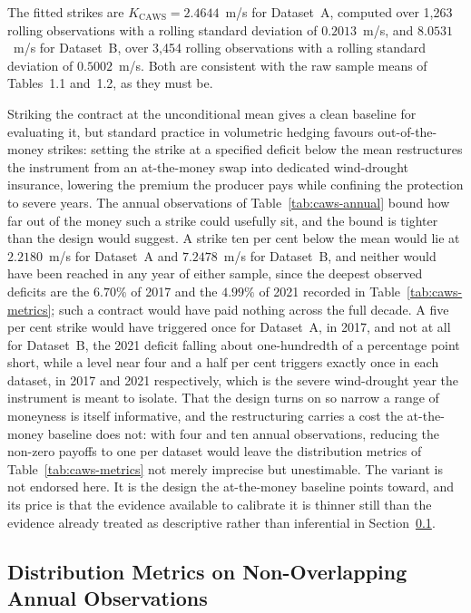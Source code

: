 \documentclass[11pt, a4paper, twoside]{article}
\begin{document}
The fitted strikes are $K_{\mathrm{CAWS}} = 2.4644$~m/s for Dataset~A, computed over 1{,}263 rolling observations with a rolling standard deviation of $0.2013$~m/s, and $8.0531$~m/s for Dataset~B, over 3{,}454 rolling observations with a rolling standard deviation of $0.5002$~m/s. Both are consistent with the raw sample means of Tables~1.1 and~1.2, as they must be.

Striking the contract at the unconditional mean gives a clean baseline for evaluating it, but standard practice in volumetric hedging favours out-of-the-money strikes: setting the strike at a specified deficit below the mean restructures the instrument from an at-the-money swap into dedicated wind-drought insurance, lowering the premium the producer pays while confining the protection to severe years. The annual observations of Table~\ref{tab:caws-annual} bound how far out of the money such a strike could usefully sit, and the bound is tighter than the design would suggest. A strike ten per cent below the mean would lie at $2.2180$~m/s for Dataset~A and $7.2478$~m/s for Dataset~B, and neither would have been reached in any year of either sample, since the deepest observed deficits are the $6.70\%$ of 2017 and the $4.99\%$ of 2021 recorded in Table~\ref{tab:caws-metrics}; such a contract would have paid nothing across the full decade. A five per cent strike would have triggered once for Dataset~A, in 2017, and not at all for Dataset~B, the 2021 deficit falling about one-hundredth of a percentage point short, while a level near four and a half per cent triggers exactly once in each dataset, in 2017 and 2021 respectively, which is the severe wind-drought year the instrument is meant to isolate. That the design turns on so narrow a range of moneyness is itself informative, and the restructuring carries a cost the at-the-money baseline does not: with four and ten annual observations, reducing the non-zero payoffs to one per dataset would leave the distribution metrics of Table~\ref{tab:caws-metrics} not merely imprecise but unestimable. The variant is not endorsed here. It is the design the at-the-money baseline points toward, and its price is that the evidence available to calibrate it is thinner still than the evidence already treated as descriptive rather than inferential in Section~\ref{sec:caws-metrics}.

\subsection{Distribution Metrics on Non-Overlapping Annual Observations}
\label{sec:caws-metrics}
\end{document}

